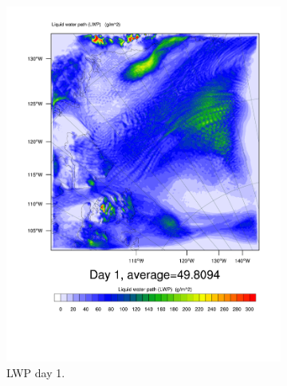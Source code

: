 \begin{figure}
    \centering
    \begin{subfigure}{0.40\textwidth}
        \centering
        \includegraphics[width=\textwidth]{results/control/LWP_Day1.pdf}
        \caption{LWP day 1.}
        \label{subfig:LWPr1Day1}
    \end{subfigure}
    \begin{subfigure}{0.40\textwidth}
        \centering

\end{subfigure}
\end{figure}
